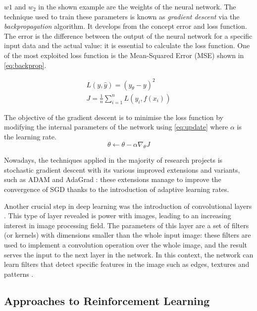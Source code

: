 $w1$ and $w_2$ in the shown example are the weights of the neural network. The technique used to train these parameters is known as \textit{gradient descent} via the \textit{backpropagation} algorithm. It develops from the concept error and loss function.  The error is the difference between the output of the neural network for a specific input data and the actual value: it is essential to calculate the loss function. One of the most exploited loss function is the Mean-Squared Error (MSE) shown in \vref{eq:backprop}.

\begin{equation}\label{eq:backprop}
\begin{aligned}
L(y, \hat{y}) = (y_\theta - y)^2 \\
J = \frac{1}{n}\sum_{i=1}^{n}L(y_i, f(x_i))
\end{aligned}
\end{equation}

The objective of the gradient descent is to minimise the loss function by modifying the internal parameters of the network using \vref{eq:update} where $\alpha$ is the learning rate.
\begin{equation}\label{eq:update}
\theta \leftarrow \theta -\alpha \nabla_\theta J
\end{equation}

Nowadays, the techniques applied in the majority of research projects is stochastic gradient descent with its various improved extensions and variants, such as ADAM \cite{kingma2014adam} and AdaGrad \cite{duchi2011adaptive}: these extensions manage to improve the convergence of SGD thanks to the introduction of adaptive learning rates.

Another crucial step in deep learning was the introduction of convolutional layers \cite{lecun1995convolutional}. This type of layer revealed is power with images, leading to an increasing interest in image processing field. The parameters of this layer are a set of filters (or kernels) with dimensions smaller than the whole input image: these filters are used to implement a convolution operation over the whole image, and the result serves the input to the next layer in the network. In this context, the network can learn filters that detect specific features in the image such as edges, textures and patterns \cite{erhan2009visualizing}.

\subsection{Approaches to Reinforcement Learning} \label{approaches}


